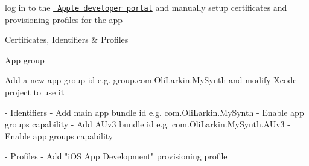 
\begin{DoxyItemize}
\item log in to the \href{https://developer.apple.com/}{\texttt{ Apple developer portal}} and manually setup certificates and provisioning profiles for the app
\item Certificates, Identifiers \& Profiles
\begin{DoxyItemize}
\item App group
\begin{DoxyItemize}
\item Add a new app group id e.\+g. group.\+com.\+Oli\+Larkin.\+My\+Synth and modify Xcode project to use it
\end{DoxyItemize}
\end{DoxyItemize}
\end{DoxyItemize}

\begin{DoxyVerb}- Identifiers
    - Add main app bundle id e.g. com.OliLarkin.MySynth
        - Enable app groups capability
    - Add AUv3 bundle id e.g. com.OliLarkin.MySynth.AUv3
        - Enable app groups capability

- Profiles
    - Add "iOS App Development" provisioning profile
\end{DoxyVerb}
 